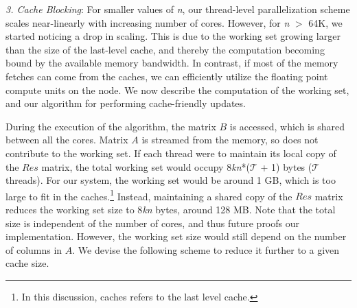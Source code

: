      \vspace*{0.05in}
     {\it{3. Cache Blocking}}: For smaller values of {\it{n}}, our
     thread-level parallelization scheme scales near-linearly with
     increasing number of cores. However, for {\it{n}} $>$ 64K, we
     started noticing a drop in scaling. This is due to the working
     set growing larger than the size of the last-level cache, and
     thereby the computation becoming bound by the available memory
     bandwidth. In contrast, if most of the memory fetches can come
     from the caches, we can efficiently  utilize the floating
     point compute units on the node. We now
     describe the computation of the working set, and our algorithm
     for performing cache-friendly updates.

     During the execution of the algorithm, the matrix $B$ is
     accessed, which is shared between all the cores. Matrix $A$ is 
     streamed from the memory, so does not contribute to
     the working set. If each thread were to maintain its local copy
     of the $Res$ matrix, the total working set would occupy
     8{\it{kn}}*($\mathcal{T}$ + 1) bytes ($\mathcal{T}$ threads). For
     our system,  
     the working set would be
     around 1 GB, which is too large to fit in the
     caches.\footnote{In this discussion, caches refers to the last
       level cache.} Instead,
   maintaining a shared copy of the $Res$ matrix reduces the working set size to
     8{\it{kn}} bytes, around 128 MB. Note that the
     total size is independent of the number of cores, and thus future
     proofs our implementation.
     However, the working set size would still depend on the
     number of columns in $A$. We devise the
     following scheme to reduce it further to a given cache size.

